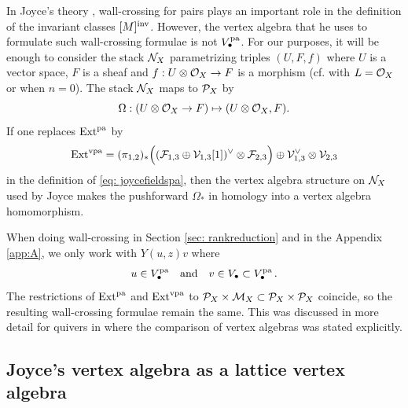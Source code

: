 \documentclass[a4paper, 12pt]{amsart}
\begin{document}
\begin{remark}\label{rem: stackNX}
In Joyce's theory \cite[Section 8]{Jo21}, wall-crossing for pairs plays an important role in the definition of the invariant classes $[M]^{\mathrm{inv}}$. However, the vertex algebra that he uses to formulate such wall-crossing formulae is not $V_\bullet^{\mathop{\rm pa}\nolimits}$. For our purposes, it will be enough to consider the stack ${\mathcal N}_X$ parametrizing triples $(U,F,f)$ where $U$ is a vector space, $F$ is a sheaf and $f:U \otimes {\mathcal O}_X\to F$ is a morphism (cf. \cite[Definition 8.2]{Jo21} with $L={\mathcal O}_X$ or \cite[Definition 2.12]{Bo21} when $n=0$). The stack ${\mathcal N}_X$ maps to ${\mathcal P}_X$ by   
\[\Omega:(U\otimes {\mathcal O}_X\to F)\mapsto (U\otimes {\mathcal O}_X,  F).\]
If one replaces $\textup{Ext}^{\mathop{\rm pa}\nolimits}$ by
$$
\textup{Ext}^{\text{vpa}} = (\pi_{1,2})_\ast\Big(({\mathcal F}_{1,3}\oplus {\mathcal V}_{1,3}[1])^\vee\otimes {\mathcal F}_{2,3}\Big)\oplus {\mathcal V}_{1,3}^\vee\otimes {\mathcal V}_{2,3}
$$
in the definition of \eqref{eq: joycefieldspa},
then the vertex algebra structure on ${\mathcal N}_X$ used by Joyce makes the pushforward $\Omega_*$ in homology into a vertex algebra homomorphism. 

When doing wall-crossing in Section \ref{sec: rankreduction} and in the Appendix \ref{app:A}, we only work with $Y(u,z)v$ where
$$
u\in V^{\mathop{\rm pa}\nolimits}_{\bullet}\quad \text{and}\quad v \in V_{\bullet}\subset V^{\mathop{\rm pa}\nolimits}_{\bullet}\,.
$$
The restrictions of $\textup{Ext}^{\mathop{\rm pa}\nolimits}$ and $\textup{Ext}^{\text{vpa}}$ to ${\mathcal P}_X\times {\mathcal M}_X\subset {\mathcal P}_X\times {\mathcal P}_X$ coincide, so the resulting wall-crossing formulae remain the same. This was discussed in more detail for quivers in \cite[Remark 3.5 and 3.12, Lemma 4.4]{BoVir} where the comparison of vertex algebras was stated explicitly. 
\end{remark}
    



\subsection{Joyce's vertex algebra as a lattice vertex algebra}
\label{sec: grossiso}
\end{document}
